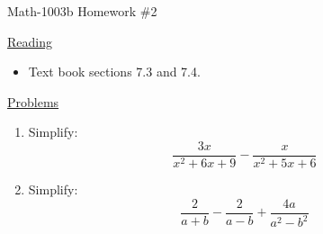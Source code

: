 \documentclass[letterpaper,12pt,fleqn]{article}
\begin{document}
\begin{center}
\Large Math-1003b Homework \#2
\end{center}

\vspace{0.5in}

\underline{Reading}

\bigskip

\begin{itemize}
\item Text book sections 7.3 and 7.4.
\end{itemize}

\bigskip

\underline{Problems}

\bigskip

\begin{enumerate}
\item Simplify:
  \[\frac{3x}{x^2+6x+9}-\frac{x}{x^2+5x+6}\]

\item Simplify:
  \[\frac{2}{a+b}-\frac{2}{a-b}+\frac{4a}{a^2-b^2}\]
\end{enumerate}
\end{document}
